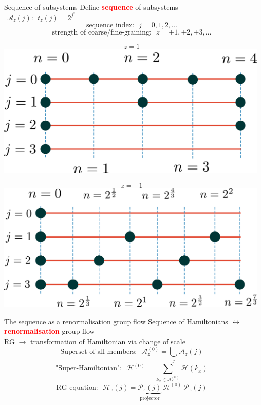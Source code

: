 \documentclass[12pt,aspectratio=169]{beamer}
\newcommand{\focus}[1]{\textcolor{red}{\bf{#1}}}
\begin{document}
\begin{frame}{Sequence of subsystems}
	Define \focus{sequence} of subsystems\\[10pt]
{\large \(~ ~ \mathcal{A}_{z}(j): ~ ~ t_z(j) = 2^{j^z}\)}
\[\text{sequence index:}~ ~ ~ j = 0,1,2,\ldots\]
\[\text{strength of coarse/fine-graining:}~ ~ ~ z = \pm 1,\pm 2,\pm 3,\ldots\]
\begin{minipage}{0.48\textwidth}
\centering
\[ z = 1\]
\includegraphics[width=0.99\textwidth]{./figures/coarse-graining.pdf}
\end{minipage}
\hspace*{\fill}
\begin{minipage}{0.49\textwidth}
\centering
\[ z = -1\]
\includegraphics[width=0.99\textwidth]{./figures/fine-graining.pdf}
\end{minipage}
\end{frame}

\begin{frame}{The sequence as a renormalisation group flow}
	Sequence of Hamiltonians {\LARGE \(\longleftrightarrow\)} \focus{renormalisation} group flow\\[10pt]
	RG \(\longrightarrow\) transformation of Hamiltonian via change of scale\\
	\[\text{Superset of all members:}~ ~ ~ \mathcal{A}_z^{(0)} = \bigcup_j \mathcal{A}_z(j)\]
	\[\text{"Super-Hamiltonian":}~ ~ ~\mathcal{H}^{(0)} = \sum_{k_x \in \mathcal{A}_z^{(0)}} \mathcal{H}\left( k_x \right)\]
	\[\text{RG equation:}~ ~ ~\mathcal{H}_z(j) = \underbrace{\mathcal{P}_z(j)}_\text{projector} ~ \mathcal{H}^{(0)} ~ \mathcal{P}_z(j)\]
\end{frame}
\end{document}
